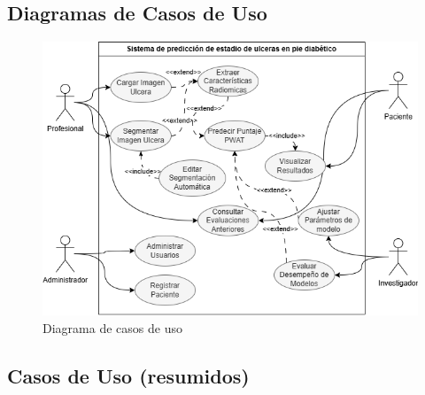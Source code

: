 \subsection{Diagramas de Casos de Uso}
\label{ssc:DCU}

\begin{figure}[H] %
    \centering
    \includegraphics[width=1.1\textwidth]{imagenes/casosdeuso.drawio.png}
    \caption{Diagrama de casos de uso}
    \label{fig:scrum}
\end{figure}


\subsection{Casos de Uso (resumidos)}
\label{ssc:CUresumido}

